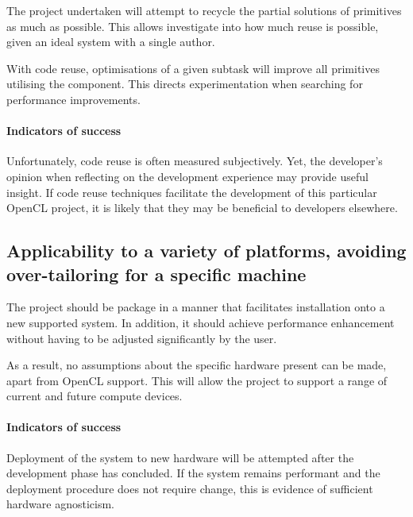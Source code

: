 The project undertaken will attempt to recycle the partial solutions of primitives as much as possible. This allows investigate into how much reuse is possible, given an ideal system with a single author.

With code reuse, optimisations of a given subtask will improve all primitives utilising the component. This directs experimentation when searching for performance improvements.

\paragraph*{Indicators of success}
Unfortunately, code reuse is often measured subjectively. Yet, the developer's opinion when reflecting on the development experience may provide useful insight. If code reuse techniques facilitate the development of this particular \ac{OpenCL} project, it is likely that they may be beneficial to developers elsewhere.

\subsection{Applicability to a variety of platforms, avoiding over-tailoring for a specific machine}
The project should be package in a manner that facilitates installation onto a new supported system. In addition, it should achieve performance enhancement without having to be adjusted significantly by the user.

As a result, no assumptions about the specific hardware present can be made, apart from \ac{OpenCL} support. This will allow the project to support a range of current and future compute devices.

\paragraph*{Indicators of success}
Deployment of the system to new hardware will be attempted after the development phase has concluded. If the system remains performant and the deployment procedure does not require change, this is evidence of sufficient hardware agnosticism.
